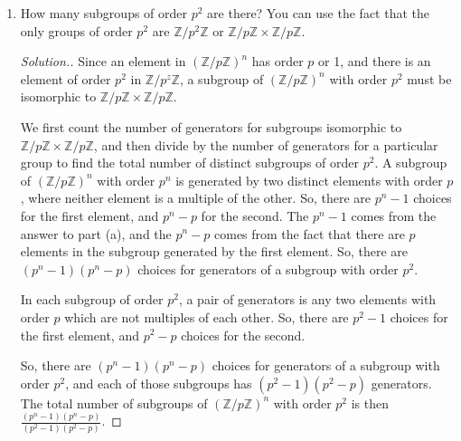\documentclass{article}
\newcommand{\sk}{\smallskip}
\newcommand{\Z}{\mathbb{Z}}
\begin{document}
\begin{enumerate}
\begin{enumerate}
        \begin{proof}[Solution.]
            We just saw that there are $p^n - 1$ total elements of order $p$ in $(\Z/p\Z)^n$. An element $a \in (\Z/p\Z)^n$ generates the cyclic group $\{0, a, 2a, \dots, (p-1)a\}$, which has order $p$. A cyclic group of order $p$ has $\phi(p) = p-1$ total generators. So, there are $p^n - 1$ total elements of order $p$, each of which generates a group of order $p$, and these groups have $p-1$ distinct generators. So, there are $\frac{p^n - 1}{p-1}$ distinct subgroups of order $p$ in $(\Z/p\Z)^n$.
        \end{proof}
        
        \item How many subgroups of order $p^2$ are there? You can use the fact that the only groups of order $p^2$ are $\Z/p^2\Z$ or $\Z/p\Z \times \Z/p\Z$.

        \begin{proof}[Solution.]
            Since an element in $(\Z/p\Z)^n$ has order $p$ or 1, and there is an element of order $p^2$ in $\Z/p^z\Z$, a subgroup of $(\Z/p\Z)^n$ with order $p^2$ must be isomorphic to $\Z/p\Z \times \Z/p\Z$.

            \sk

            We first count the number of generators for subgroups isomorphic to $\Z/p\Z \times \Z/p\Z$, and then divide by the number of generators for a particular group to find the total number of distinct subgroups of order $p^2$. A subgroup of $(\Z/p\Z)^n$ with order $p^n$ is generated by two distinct elements with order $p$, where neither element is a multiple of the other. So, there are $p^n - 1$ choices for the first element, and $p^n - p$ for the second. The $p^n - 1$ comes from the answer to part (a), and the $p^n - p$ comes from the fact that there are $p$ elements in the subgroup generated by the first element. So, there are $(p^n - 1)(p^n - p)$ choices for generators of a subgroup with order $p^2$.

            \sk

            In each subgroup of order $p^2$, a pair of generators is any two elements with order $p$ which are not multiples of each other. So, there are $p^2 - 1$ choices for the first element, and $p^2 - p$ choices for the second. 

            \sk

            So, there are $(p^n - 1)(p^n - p)$ choices for generators of a subgroup with order $p^2$, and each of those subgroups has $(p^2 - 1)(p^2 - p)$ generators. The total number of subgroups of $(\Z/p\Z)^n$ with order $p^2$ is then $\frac{(p^n - 1)(p^n - p)}{(p^2 - 1)(p^2 - p)}$.
            

\end{proof}
\end{enumerate}
\end{enumerate}
\end{document}
